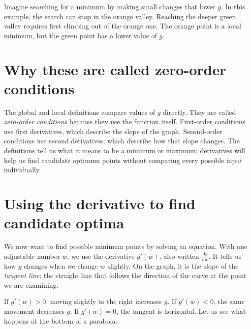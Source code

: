 \documentclass[a4paper,12pt,oneside]{report}
\begin{document}
Imagine searching for a minimum by making small changes that lower
$g$. In this example, the search can stop in the orange valley.
Reaching the deeper green valley requires first climbing out of the
orange one. The orange point is a local minimum, but the green point
has a lower value of $g$.

\section{Why these are called zero-order conditions}

The global and local definitions compare values of $g$ directly.
They are called \emph{zero-order conditions} because they use the
function itself. First-order conditions use first derivatives, which
describe the slope of the graph. Second-order conditions use second
derivatives, which describe how that slope changes. The definitions
tell us what it means to be a minimum or maximum; derivatives will
help us find candidate optimum points without comparing every
possible input individually.

\clearpage
\section{Using the derivative to find candidate optima}

We now want to find possible minimum points by solving an equation.
With one adjustable number $w$, we use the derivative $g'(w)$, also
written $\frac{\mathrm{d}g}{\mathrm{d}w}$. It tells us how $g$ changes
when we change $w$ slightly. On the graph, it is the slope of the
\emph{tangent line}: the straight line that follows the direction
of the curve at the point we are examining.

If $g'(w)>0$, moving slightly to the right increases $g$.
If $g'(w)<0$, the same movement decreases $g$.
If $g'(w)=0$, the tangent is horizontal. Let us see what happens
at the bottom of a parabola.
\end{document}
